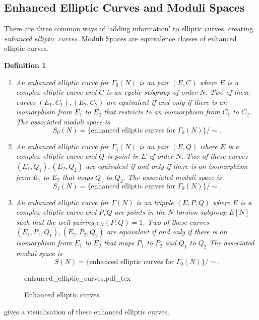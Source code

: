 \documentclass[a4paper]{article}
\newcommand{\incfig}[1]{%
	\def\svgwidth{\columnwidth}
	{#1.pdf_tex}
}
\theoremstyle{theoremdd}
\theoremstyle{definitiondd}
\newtheorem{definition}[theorem]{Definition}
\theoremstyle{remarkdd}
\begin{document}
\subsection{Enhanced Elliptic Curves and Moduli Spaces} \label{sec:enhanced_elliptic_curves_and_moduli_spaces}
There are three common ways of `adding information' to elliptic curves, creating \emph{enhanced elliptic curves}. Moduli Spaces are equivalence classes of enhanced elliptic curves.  
\begin{definition} \hspace{\linewidth}
	\begin{enumerate}
		\item An \emph{enhanced elliptic curve for $\Gamma_0(N)$} is an pair $(E, C)$ where  $E$ is a complex elliptic curve and $C$ is an cyclic subgroup of order $N$.
		Two of these curves $(E_1, C_1), (E_2, C_2)$ are equivalent if and only if there is an isomorphism from $E_1$ to $E_2$ that restricts to an isomorphism from $C_1$ to $C_2$.
		The associated \emph{moduli space} is \[
			S_0(N) = \{ \text{enhanced elliptic curves for } \Gamma_0(N)\} / \sim
		.\] 
	\item An \emph{enhanced elliptic curve for $\Gamma_1(N)$} is an pair $(E, Q)$ where  $E$ is a complex elliptic curve and $Q$ is point in $E$ of order $N$.
		Two of these curves $(E_1, Q_1), (E_2, Q_2)$ are equivalent if and only if there is an isomorphism from $E_1$ to $E_2$ that maps $Q_1$ to $Q_2$.
		The associated \emph{moduli space} is \[
			S_1(N) = \{ \text{enhanced elliptic curves for } \Gamma_0(N)\} / \sim
		.\] 
	\item An \emph{enhanced elliptic curve for $\Gamma(N)$} is an tripple $(E, P, Q)$ where  $E$ is a complex elliptic curve and $P, Q$ are points in the $N$-torsion subgroup $E[N]$ such  that the weil pairing  $e_N(P, Q) = 1$.
		Two of these curves $(E_1, P_1, Q_1), (E_2, P_2, Q_2)$ are equivalent if and only if there is an isomorphism from $E_1$ to $E_2$ that maps $P_1$ to $P_2$ and $Q_1$ to $Q_2$
		The associated \emph{moduli space} is \[
			S(N) = \{ \text{enhanced elliptic curves for } \Gamma_0(N)\} / \sim
		.\] 
	\end{enumerate}	
\end{definition}
\begin{figure}[h]
	\centering
	\incfig{enhanced_elliptic_curves}
	\caption{Enhanced elliptic curves}
	\label{fig:enhanced_elliptic_curves}
\end{figure}
 gives a visualisation of these enhanced elliptic curves.
\end{document}
